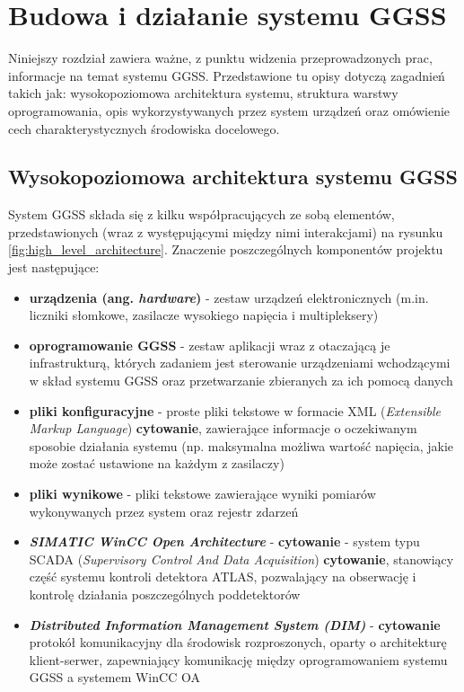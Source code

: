 \chapter{Budowa i działanie systemu GGSS}
\label{cha:ggss}

Niniejszy rozdział zawiera ważne, z punktu widzenia przeprowadzonych prac, informacje na temat systemu GGSS. Przedstawione tu opisy dotyczą zagadnień takich jak: wysokopoziomowa architektura systemu, struktura warstwy oprogramowania, opis wykorzystywanych przez system urządzeń oraz omówienie cech charakterystycznych środowiska docelowego. 


\section{Wysokopoziomowa architektura systemu GGSS}
System GGSS składa się z kilku współpracujących ze sobą elementów, przedstawionych (wraz z występującymi między nimi interakcjami) na rysunku \ref{fig:high_level_architecture}. Znaczenie poszczególnych komponentów projektu jest następujące:
\begin{itemize}
    \item \textbf{urządzenia (ang. \emph{hardware})} - zestaw urządzeń elektronicznych (m.in. liczniki słomkowe, zasilacze wysokiego napięcia i multipleksery)
    \item \textbf{oprogramowanie GGSS} - zestaw aplikacji wraz z otaczającą je infrastrukturą, których zadaniem jest sterowanie urządzeniami wchodzącymi w skład systemu GGSS oraz przetwarzanie zbieranych za ich pomocą danych
    \item \textbf{pliki konfiguracyjne} - proste pliki tekstowe w formacie XML (\emph{Extensible Markup Language}) \textbf{cytowanie}, zawierające informacje o oczekiwanym sposobie działania systemu (np. maksymalna możliwa wartość napięcia, jakie może zostać ustawione na każdym z zasilaczy)
    \item \textbf{pliki wynikowe} - pliki tekstowe zawierające wyniki pomiarów wykonywanych przez system oraz rejestr zdarzeń 
    \item \emph{\textbf{SIMATIC WinCC Open Architecture}} - \textbf{cytowanie} - system typu SCADA (\emph{Supervisory Control And Data Acquisition}) \textbf{cytowanie}, stanowiący część systemu kontroli detektora ATLAS, pozwalający na obserwację i kontrolę działania poszczególnych poddetektorów
    \item \emph{\textbf{Distributed Information Management System (DIM)}} - \textbf{cytowanie} protokół komunikacyjny dla środowisk rozproszonych, oparty o architekturę klient-serwer, zapewniający komunikację między oprogramowaniem systemu GGSS a systemem WinCC OA
\end{itemize}

